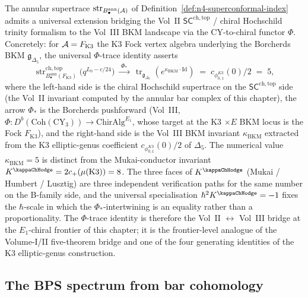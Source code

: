 \begin{remark}
\label{rem:oackd-front-universal-phi-trace}
%
%
%
%
%
The annular supertrace $\operatorname{str}_{B^{\mathrm{ann}}_\bullet(\mathcal{A})}$
of Definition~\ref{def:n4-superconformal-index} admits a
universal extension bridging the Vol~II
$\mathsf{SC}^{\mathrm{ch,top}}$ / chiral Hochschild trinity
formalism to the Vol~III BKM landscape via the CY-to-chiral
functor $\Phi$. Concretely: for $\mathcal{A} = F_{\mathrm{K3}}$ the
K3 Fock vertex algebra underlying the Borcherds BKM
$\mathfrak{g}_{\Delta_5}$, the universal $\Phi$-trace
identity asserts
\[
 \operatorname{str}_{B^{\mathrm{ann}}_\bullet(F_{\mathrm{K3}})}^{\mathrm{ch,top}}
 \bigl(q^{L_0-c/24}\bigr)
 \;\xrightarrow{\;\Phi_{*}\;}\;
 \operatorname{tr}_{\mathfrak{g}_{\Delta_5}}(e^{\kappa_{\mathrm{BKM}}\cdot\mathrm{Id}})
 \;=\;
 c_{\phi_{0,1}^{K3}}(0)/2
 \;=\;
 5,
\]
where the left-hand side is the chiral Hochschild supertrace on the
$\mathsf{SC}^{\mathrm{ch,top}}$ side (the Vol~II invariant computed
by the annular bar complex of this chapter), the arrow
$\Phi_{*}$ is the Borcherds pushforward (Vol~III,
$\Phi\colon D^b(\mathrm{Coh}(\mathrm{CY}_3)) \to
\mathrm{ChirAlg}^{E_1}$, whose target at the K3 $\times E$
BKM locus is the Fock $F_{\mathrm{K3}}$), and the right-hand
side is the Vol~III BKM invariant $\kappa_{\mathrm{BKM}}$
extracted from the K3 elliptic-genus coefficient
$c_{\phi_{0,1}^{K3}}(0)/2$ of $\Delta_5$. The numerical value
$\kappa_{\mathrm{BKM}} = 5$ is distinct from the
Mukai-conductor invariant $K^{\kappaChHodge} =
2 c_+(\mu(\mathrm{K3})) = 8$. The three faces of
$K^{\kappaChHodge}$ (Mukai / Humbert / Lusztig) are three independent verification
paths for the same number on the B-family
side, and the universal specialisation
$\hbar^2 K^{\kappaChHodge} = -1$ fixes the
$\hbar$-scale in which the $\Phi_*$-intertwining is an
equality rather than a proportionality. The $\Phi$-trace
identity is therefore the Vol~II $\leftrightarrow$ Vol~III
bridge at the $E_1$-chiral frontier of this chapter; it is
the frontier-level analogue of the Volume-I/II five-theorem
bridge and one of the four generating identities of the
K3 elliptic-genus construction.
\end{remark}

\subsection{The BPS spectrum from bar cohomology}
\label{subsec:bps-spectrum}

